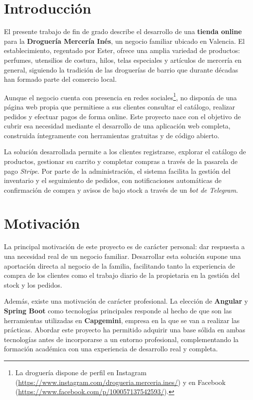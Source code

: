 
\section{Introducción}

El presente trabajo de fin de grado describe el desarrollo de una \textbf{tienda online} para la \textbf{Droguería Mercería Inés}, un negocio familiar ubicado en Valencia. El establecimiento, regentado por Ester, ofrece una amplia variedad de productos: perfumes, utensilios de costura, hilos, telas especiales y artículos de mercería en general, siguiendo la tradición de las droguerías de barrio que durante décadas han formado parte del comercio local.

Aunque el negocio cuenta con presencia en redes sociales\footnote{La droguería dispone de perfil en Instagram (\url{https://www.instagram.com/drogueria.merceria.ines/}) y en Facebook (\url{https://www.facebook.com/p/100057137542593/}).}, no disponía de una página web propia que permitiese a sus clientes consultar el catálogo, realizar pedidos y efectuar pagos de forma online. Este proyecto nace con el objetivo de cubrir esa necesidad mediante el desarrollo de una aplicación web completa, construida íntegramente con herramientas gratuitas y de código abierto.

La solución desarrollada permite a los clientes registrarse, explorar el catálogo de productos, gestionar su carrito y completar compras a través de la pasarela de pago \textit{Stripe}. Por parte de la administración, el sistema facilita la gestión del inventario y el seguimiento de pedidos, con notificaciones automáticas de confirmación de compra y avisos de bajo stock a través de un \textit{bot de Telegram}.

\section{Motivación}

La principal motivación de este proyecto es de carácter personal: dar respuesta a una necesidad real de un negocio familiar. Desarrollar esta solución supone una aportación directa al negocio de la familia, facilitando tanto la experiencia de compra de los clientes como el trabajo diario de la propietaria en la gestión del stock y los pedidos.

Además, existe una motivación de carácter profesional. La elección de \textbf{Angular} y \textbf{Spring Boot} como tecnologías principales responde al hecho de que son las herramientas utilizadas en \textbf{Capgemini}, empresa en la que se van a realizar las prácticas. Abordar este proyecto ha permitido adquirir una base sólida en ambas tecnologías antes de incorporarse a un entorno profesional, complementando la formación académica con una experiencia de desarrollo real y completa.

